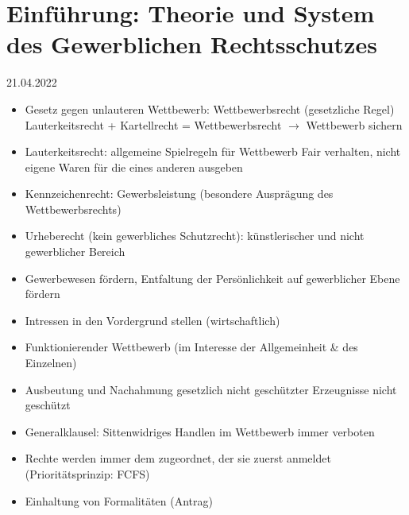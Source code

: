 \documentclass{report}
\begin{document}
\chapter{Einführung: Theorie und System des Gewerblichen Rechtsschutzes}
21.04.2022
\begin{itemize}
	\item Gesetz gegen unlauteren Wettbewerb: Wettbewerbsrecht (gesetzliche Regel)
	\newline Lauterkeitsrecht + Kartellrecht = Wettbewerbsrecht
	\newline $\rightarrow$ Wettbewerb sichern
	\item Lauterkeitsrecht: allgemeine Spielregeln für Wettbewerb
	\newline Fair verhalten, nicht eigene Waren für die eines anderen ausgeben
	\item Kennzeichenrecht: Gewerbsleistung (besondere Ausprägung des Wettbewerbsrechts)
	\item Urheberecht (kein gewerbliches Schutzrecht): künstlerischer und nicht gewerblicher Bereich
	\item Gewerbewesen fördern, Entfaltung der Persönlichkeit auf gewerblicher Ebene fördern
	\item Intressen in den Vordergrund stellen (wirtschaftlich)
	\item Funktionierender Wettbewerb (im Interesse der Allgemeinheit \& des Einzelnen)
	\item Ausbeutung und Nachahmung gesetzlich nicht geschützter Erzeugnisse nicht geschützt
	\item Generalklausel: Sittenwidriges Handlen im Wettbewerb immer verboten
	\item Rechte werden immer dem zugeordnet, der sie zuerst anmeldet (Prioritätsprinzip: FCFS)
	\item Einhaltung von Formalitäten (Antrag)
\end{itemize}
\end{document}
